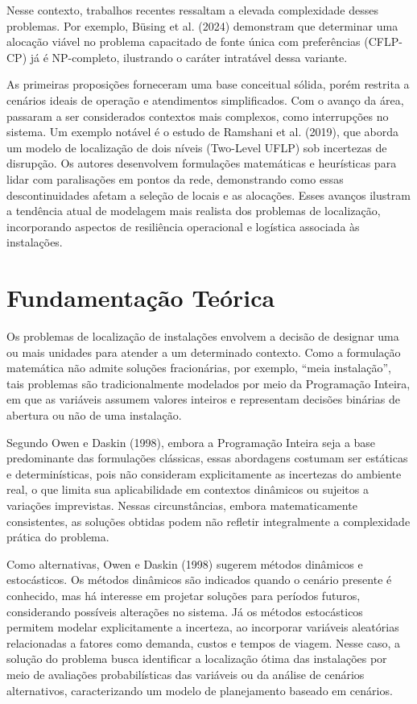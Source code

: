 \documentclass[12pt]{article}
\begin{document}
Nesse contexto, trabalhos recentes ressaltam a elevada complexidade desses problemas. Por exemplo, Büsing et al. (2024) demonstram que determinar uma alocação viável no problema capacitado de fonte única com preferências (CFLP-CP) já é NP-completo, ilustrando o caráter intratável dessa variante.

As primeiras proposições forneceram uma base conceitual sólida, porém restrita a cenários ideais de operação e atendimentos simplificados. Com o avanço da área, passaram a ser considerados contextos mais complexos, como interrupções no sistema. Um exemplo notável é o estudo de Ramshani et al. (2019), que aborda um modelo de localização de dois níveis (Two-Level UFLP) sob incertezas de disrupção. Os autores desenvolvem formulações matemáticas e heurísticas para lidar com paralisações em pontos da rede, demonstrando como essas descontinuidades afetam a seleção de locais e as alocações. Esses avanços ilustram a tendência atual de modelagem mais realista dos problemas de localização, incorporando aspectos de resiliência operacional e logística associada às instalações.

\section{Fundamentação Teórica}

Os problemas de localização de instalações envolvem a decisão de designar uma ou mais unidades para atender a um determinado contexto. Como a formulação matemática não admite soluções fracionárias, por exemplo, “meia instalação”, tais problemas são tradicionalmente modelados por meio da Programação Inteira, em que as variáveis assumem valores inteiros e representam decisões binárias de abertura ou não de uma instalação.

Segundo Owen e Daskin (1998), embora a Programação Inteira seja a base predominante das formulações clássicas, essas abordagens costumam ser estáticas e determinísticas, pois não consideram explicitamente as incertezas do ambiente real, o que limita sua aplicabilidade em contextos dinâmicos ou sujeitos a variações imprevistas. Nessas circunstâncias, embora matematicamente consistentes, as soluções obtidas podem não refletir integralmente a complexidade prática do problema.

Como alternativas, Owen e Daskin (1998) sugerem métodos dinâmicos e estocásticos. Os métodos dinâmicos são indicados quando o cenário presente é conhecido, mas há interesse em projetar soluções para períodos futuros, considerando possíveis alterações no sistema. Já os métodos estocásticos permitem modelar explicitamente a incerteza, ao incorporar variáveis aleatórias relacionadas a fatores como demanda, custos e tempos de viagem. Nesse caso, a solução do problema busca identificar a localização ótima das instalações por meio de avaliações probabilísticas das variáveis ou da análise de cenários alternativos, caracterizando um modelo de planejamento baseado em cenários.
\end{document}
